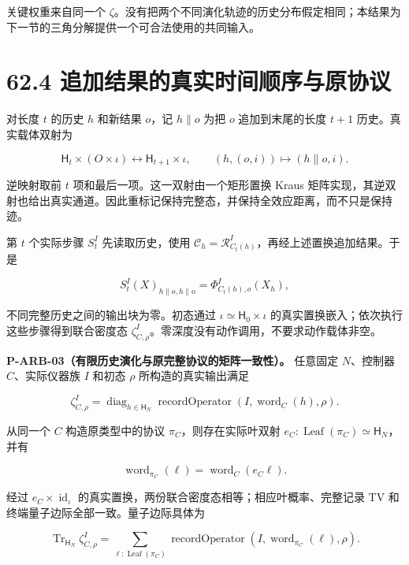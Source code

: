 \documentclass[
  11pt,
  oneside]{book}
\begin{document}
关键权重来自同一个
\(\zeta\)。没有把两个不同演化轨迹的历史分布假定相同；本结果为下一节的三角分解提供一个可合法使用的共同输入。

\hypertarget{ux8ffdux52a0ux7ed3ux679cux7684ux771fux5b9eux65f6ux95f4ux987aux5e8fux4e0eux539fux534fux8bae}{%
\section{62.4
追加结果的真实时间顺序与原协议}\label{ux8ffdux52a0ux7ed3ux679cux7684ux771fux5b9eux65f6ux95f4ux987aux5e8fux4e0eux539fux534fux8bae}}

对长度 \(t\) 的历史 \(h\) 和新结果 \(o\)，记 \(h\mathbin{\|}o\) 为把
\(o\) 追加到末尾的长度 \(t+1\) 历史。真实载体双射为

\[
\mathsf H_t\times(O\times\iota)
\longleftrightarrow\mathsf H_{t+1}\times\iota,
\qquad(h,(o,i))\longmapsto(h\mathbin{\|}o,i).
\]

逆映射取前 \(t\) 项和最后一项。这一双射由一个矩形置换 Kraus
矩阵实现，其逆双射也给出真实通道。因此重标记保持完整态，并保持全效应距离，而不只是保持迹。

第 \(t\) 个实际步骤 \(S^I_t\) 先读取历史，使用
\(\mathcal C_h=\mathcal R^I_{C_t(h)}\)，再经上述置换追加结果。于是

\[
S^I_t(X)_{h\|o,h\|o}
=\Phi^I_{C_t(h),o}(X_h),
\]

不同完整历史之间的输出块为零。初态通过
\(\iota\simeq\mathsf H_0\times\iota\)
的真实置换嵌入；依次执行这些步骤得到联合密度态
\(\zeta^I_{C,\rho}\)。零深度没有动作调用，不要求动作载体非空。

\protect\hypertarget{p-arb-03}{}{}

\textbf{P-ARB-03（有限历史演化与原完整协议的矩阵一致性）。} 任意固定
\(N\)、控制器 \(C\)、实际仪器族 \(I\) 和初态 \(\rho\)
所构造的真实输出满足

\[
\zeta^I_{C,\rho}
=\operatorname{diag}_{h\in\mathsf H_N}
 \operatorname{recordOperator}(I,\operatorname{word}_C(h),\rho).
\]

从同一个 \(C\) 构造原类型中的协议 \(\pi_C\)，则存在实际叶双射
\(e_C:\operatorname{Leaf}(\pi_C)\simeq\mathsf H_N\)，并有

\[
\operatorname{word}_{\pi_C}(\ell)
=\operatorname{word}_C(e_C\ell).
\]

经过 \(e_C\times\operatorname{id}_\iota\)
的真实置换，两份联合密度态相等；相应叶概率、完整记录 TV
和终端量子边际全部一致。量子边际具体为

\[
\operatorname{Tr}_{\mathsf H_N}\zeta^I_{C,\rho}
=\sum_{\ell:\operatorname{Leaf}(\pi_C)}
 \operatorname{recordOperator}(I,\operatorname{word}_{\pi_C}(\ell),\rho).
\]
\end{document}
